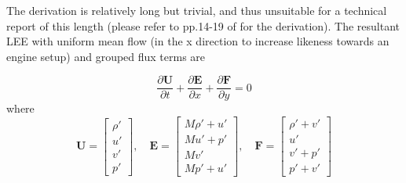 The derivation is relatively long but trivial, and thus unsuitable for a technical report of this length (please refer to pp.14-19 of \textcite{velu2010development} for the derivation). The resultant LEE with uniform mean flow (in the x direction to increase likeness towards an engine setup) and grouped flux terms are


\begin{equation} \label{eq:LEE}
    \frac{\partial \mathbf{U}}{\partial t} + \frac{\partial \mathbf{E}}{\partial x} + \frac{\partial \mathbf{F}}{\partial y} = 0
\end{equation}
where
\begin{displaymath}
\mathbf{U} = 
\begin{bmatrix}
\rho' \\
u' \\
v' \\
p'
\end{bmatrix}, \quad
\mathbf{E} = 
\begin{bmatrix}
M \rho' + u' \\
M u' + p' \\
M v' \\
M p' + u'
\end{bmatrix}, \quad
\mathbf{F} = 
\begin{bmatrix}
\rho' + v' \\
u' \\
v' + p' \\
p' + v'
\end{bmatrix}
\end{displaymath}

